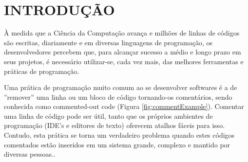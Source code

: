 \documentclass{abnt}
\begin{document}








 


\folhaderosto 








\chapter{INTRODUÇÃO}


À medida que a Ciência da Computação avança e milhões de linhas de códigos são 
escritas, diariamente e em diversas linguagens de programação, os desenvolvedores 
percebem que, para alcançar sucesso a médio e longo prazo em seus projetos, é
necessário utilizar-se, cada vez mais, das melhores ferramentas e práticas de 
programação. 

Uma prática de programação muito comum ao se desenvolver softwares é a de 
''remover'' uma linha ou um bloco de código tornando-os comentários, sendo conhecida  
como commented-out code (Figura \ref{fig:commentExample}). Comentar uma linha de código 
pode ser útil, tanto que 
os próprios ambientes de programação (IDE's e editores de texto) oferecem atalhos 
fáceis para isso. Contudo, esta prática se torna um verdadeiro problema quando 
estes códigos comentados estão inseridos em um sistema grande, complexo e
mantido por diversas pessoas.\cite{cleanCode}.
\end{document}
